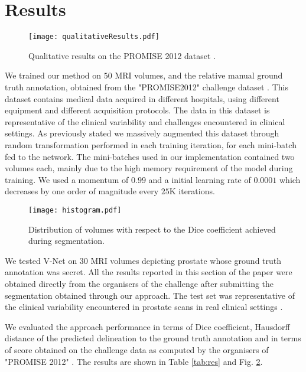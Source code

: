 \documentclass{llncs}
\begin{document}
\section{Results}
\label{sec:results}

\begin{figure} 	
\centering 	
\texttt{[image: qualitativeResults.pdf]} 	
\caption{Qualitative results on the PROMISE 2012 dataset \cite{litjens2014evaluation}.} \label{fig:qualitative} 
\end{figure}

We trained our method on $50$ MRI volumes, and the relative manual ground truth annotation, obtained from the "PROMISE2012" challenge dataset \cite{litjens2014evaluation}. This dataset contains medical data acquired in different hospitals, using different equipment and different acquisition protocols. The data in this dataset is representative of the clinical variability and challenges encountered in clinical settings. As previously stated we massively augmented this dataset through random transformation performed in each training iteration, for each mini-batch fed to the network. The mini-batches used in our implementation contained two volumes each, mainly due to the high memory requirement of the model during training. We used a momentum of $0.99$ and a initial learning rate of $0.0001$ which decreases by one order of magnitude every $25$K iterations. 

\begin{figure} 	
\centering 	
\texttt{[image: histogram.pdf]} 	
\caption{Distribution of volumes with respect to the Dice coefficient achieved during segmentation.} 
\label{fig:hist} 
\end{figure}

We tested V-Net on $30$ MRI volumes depicting prostate whose ground truth annotation was secret. All the results reported in this section of the paper were obtained directly from the organisers of the challenge after submitting the segmentation obtained through our approach. The test set was representative of the clinical variability encountered in prostate scans in real clinical settings \cite{litjens2014evaluation}. 

We evaluated the approach performance in terms of Dice coefficient, Hausdorff distance of the predicted delineation to the ground truth annotation and in terms of score obtained on the challenge data as computed by the organisers of "PROMISE 2012" \cite{litjens2014evaluation}. The results are shown in Table \ref{tab:res} and Fig. \ref{fig:hist}.
\end{document}
